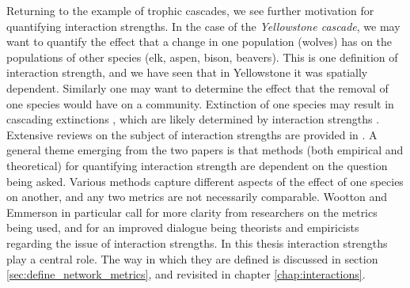 Returning to the example of trophic cascades, we see further motivation for quantifying interaction strengths. In the case of the \emph{Yellowstone cascade}, we may want to quantify the effect that a change in one population (wolves) has on the populations of other species (elk, aspen, bison, beavers). This is one definition of interaction strength, and we have seen that in Yellowstone it was spatially dependent. Similarly one may want to determine the effect that the removal of one species would have on a community. Extinction of one species may result in cascading extinctions \cite{evans2013robustness}, which are likely determined by interaction strengths \cite{eklof2006species,kaiser2010robustness}. Extensive reviews on the subject of interaction strengths are provided in \cite{berlow2004interaction,wootton2005measurement}.  A general theme emerging from the two papers is that methods (both empirical and theoretical) for quantifying interaction strength are dependent on the question being asked. Various methods capture different aspects of the effect of one species on another, and any two metrics are not necessarily comparable. Wootton and Emmerson \cite{wootton2005measurement} in particular call for more clarity from researchers on the metrics being used, and for an improved dialogue being theorists and empiricists regarding the issue of interaction strengths. In this thesis interaction strengths play a central role. The way in which they are defined is discussed in section \ref{sec:define_network_metrics}, and revisited in chapter \ref{chap:interactions}.




